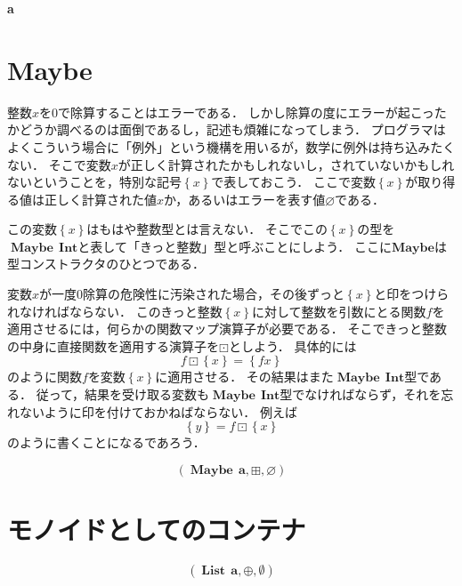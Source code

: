 \documentclass[twocolumn]{jsbook}
\newenvironment{leader}{\begingroup\bf}{\endgroup}
\newcommand{\typename}[1]{\mathbf{#1}}
\newcommand{\typeconstructor}[2]{\mathop{#1}\,#2}
\newcommand{\typeint}{\typename{Int}}
\newcommand{\typelist}{\typename{List}}
\newcommand{\typemaybe}{\typename{Maybe}}
\newcommand{\constantempty}{\emptyset}
\newcommand{\constantnothing}{\varnothing}
\newcommand{\binarylistappend}{\oplus}
\newcommand{\binarymaybefunctormap}{\boxdot}
\newcommand{\binarymaybeappend}{\boxplus}
\newcommand{\maybetype}[1]{\left\{#1\right\}}
\begin{document}
\begin{leader}
a
\end{leader}


\section{Maybe}

整数$x$を$0$で除算することはエラーである．
しかし除算の度にエラーが起こったかどうか調べるのは面倒であるし，記述も煩雑になってしまう．
プログラマはよくこういう場合に「例外」という機構を用いるが，数学に例外は持ち込みたくない．
そこで変数$x$が正しく計算されたかもしれないし，されていないかもしれないということを，特別な記号$\maybetype{x}$で表しておこう．
ここで変数$\maybetype{x}$が取り得る値は正しく計算された値$x$か，あるいはエラーを表す値$\constantnothing$である．

この変数$\maybetype{x}$はもはや整数型とは言えない．
そこでこの$\maybetype{x}$の型を$\typeconstructor{\typemaybe}{\typeint}$と表して「きっと整数」型と呼ぶことにしよう．
ここに$\typemaybe$は型コンストラクタのひとつである．

変数$x$が一度$0$除算の危険性に汚染された場合，その後ずっと$\maybetype{x}$と印をつけられなければならない．
このきっと整数$\maybetype{x}$に対して整数を引数にとる関数$f$を適用させるには，何らかの関数マップ演算子が必要である．
そこできっと整数の中身に直接関数を適用する演算子を$\binarymaybefunctormap$としよう．
具体的には$$f\binarymaybefunctormap\maybetype{x}=\maybetype{fx}$$のように関数$f$を変数$\maybetype{x}$に適用させる．
その結果はまた$\typeconstructor{\typemaybe}{\typeint}$型である．
従って，結果を受け取る変数も$\typeconstructor{\typemaybe}{\typeint}$型でなければならず，それを忘れないように印を付けておかねばならない．
例えば$$\maybetype{y}=f\binarymaybefunctormap\maybetype{x}$$のように書くことになるであろう．

$$(\typeconstructor{\typemaybe}{\typename{a}},\binarymaybeappend,\constantnothing)$$

\section{モノイドとしてのコンテナ}

$$(\typeconstructor{\typelist}{\typename{a}},\binarylistappend,\constantempty)$$

\end{document}
